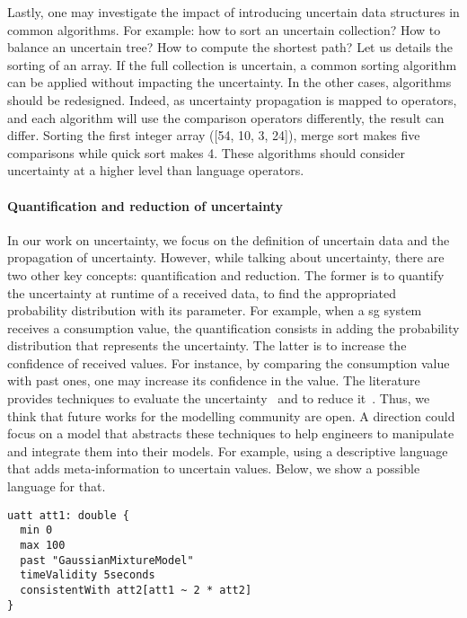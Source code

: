 Lastly, one may investigate the impact of introducing uncertain data structures in common algorithms.
For example: how to sort an uncertain collection? How to balance an uncertain tree? How to compute the shortest path?
Let us details the sorting of an array.
If the full collection is uncertain, a common sorting algorithm can be applied without impacting the uncertainty.
In the other cases, algorithms should be redesigned.
Indeed, as uncertainty propagation is mapped to operators, and each algorithm will use the comparison operators differently, the result can differ.
Sorting the first integer array ([54, 10, 3, 24]), merge sort makes five comparisons while quick sort makes 4. 
These algorithms should consider uncertainty at a higher level than language operators.

\paragraph{Quantification and reduction of uncertainty}
In our work on uncertainty, we focus on the definition of uncertain data and the propagation of uncertainty.
However, while talking about uncertainty, there are two other key concepts: quantification and reduction.
The former is to quantify the uncertainty at runtime of a received data, \eg to find the appropriated probability distribution with its parameter.
For example, when a \gls{sg} system receives a consumption value, the quantification consists in adding the probability distribution that represents the uncertainty.
The latter is to increase the confidence of received values.
For instance, by comparing the consumption value with past ones, one may increase its confidence in the value.
The literature provides techniques to evaluate the uncertainty~\cite{wubbeler2008evaluation, metrology2008evaluation} and to reduce it~\cite{shafer1992dempster}.
Thus, we think that future works for the modelling community are open.
A direction could focus on a \gls{model} that abstracts these techniques to help engineers to manipulate and integrate them into their models.
For example, using a descriptive language that adds meta-information to uncertain values.
Below, we show a possible language for that.

\begin{lstlisting}[style=pouetPouetStyle, caption=Example of a descriptive language to define meta-information uncertainty]
uatt att1: double {
  min 0
  max 100
  past "GaussianMixtureModel"
  timeValidity 5seconds
  consistentWith att2[att1 ~ 2 * att2]
}
\end{lstlisting}


